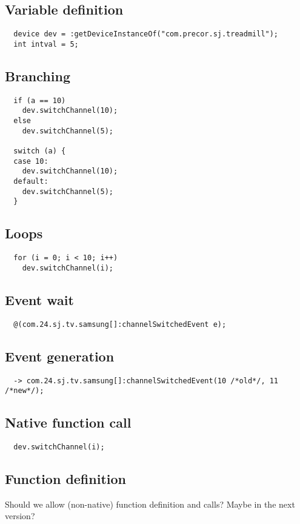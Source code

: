 \documentclass{note}
\begin{document}
\subsection{Variable definition}
\begin{verbatim}
  device dev = :getDeviceInstanceOf("com.precor.sj.treadmill");
  int intval = 5;
\end{verbatim}

\subsection{Branching}
\begin{verbatim}
  if (a == 10)
    dev.switchChannel(10);
  else
    dev.switchChannel(5);

  switch (a) {
  case 10: 
    dev.switchChannel(10);
  default: 
    dev.switchChannel(5);
  }
\end{verbatim}

\subsection{Loops}
\begin{verbatim}
  for (i = 0; i < 10; i++)
    dev.switchChannel(i);    
\end{verbatim}

\subsection{Event wait}
\begin{verbatim}
  @(com.24.sj.tv.samsung[]:channelSwitchedEvent e);
\end{verbatim}

\subsection{Event generation}
\begin{verbatim}
  -> com.24.sj.tv.samsung[]:channelSwitchedEvent(10 /*old*/, 11 /*new*/);
\end{verbatim}

\subsection{Native function call}
\begin{verbatim}
  dev.switchChannel(i);    
\end{verbatim}

\subsection{Function definition}
Should we allow (non-native) function definition and calls?
Maybe in the next version?
\end{document}
